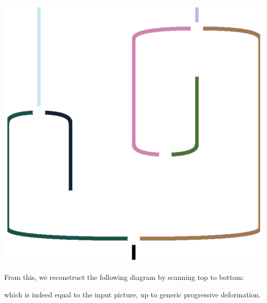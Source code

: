 \begin{example}
\begin{center}
\hspace{10pt}
\includegraphics[scale=.2]{img/bitmap2diagram/wires.png}
\end{center}

From this, we reconstruct the following diagram by scanning top to bottom:


which is indeed equal to the input picture, up to generic progressive deformation.
\end{example}

